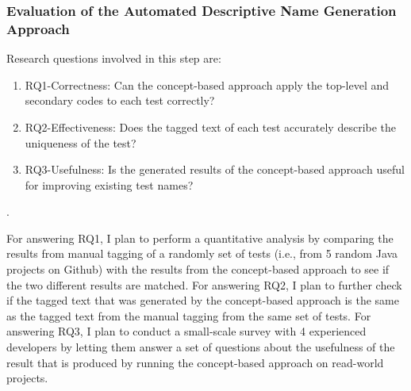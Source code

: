 \subsubsection{Evaluation of the Automated Descriptive Name Generation Approach}

Research questions involved in this step are:
%
\begin{enumerate}
    \item RQ1-Correctness: Can the concept-based approach apply the top-level and secondary codes to each test correctly?
    \item RQ2-Effectiveness: Does the tagged text of each test accurately describe the uniqueness of the test?
    \item RQ3-Usefulness: Is the generated results of the concept-based approach useful for improving existing test names?
\end{enumerate}.

For answering RQ1, I plan to perform a quantitative analysis by comparing the results from manual tagging of a randomly set of tests (i.e., from 5 random Java projects on Github) with the results from the concept-based approach to see if the two different results are matched.
%
For answering RQ2, I plan to further check if the tagged text that was generated by the concept-based approach is the same as the tagged text from the manual tagging from the same set of tests.
%
For answering RQ3, I plan to conduct a small-scale survey with 4 experienced developers by letting them answer a set of questions about the usefulness of the result that is produced by running the concept-based approach on read-world projects.


